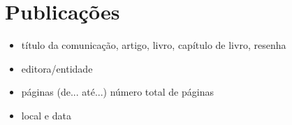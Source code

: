 \chapter{Publicações}\label{ch:introducao}
\begin{itemize}
	\item título da comunicação, artigo, livro, capítulo de livro, resenha
	\item editora/entidade
	\item páginas (de... até...) número total de páginas 
	\item local e data
\end{itemize}